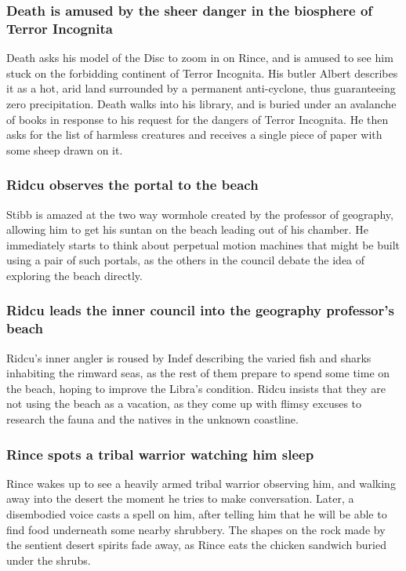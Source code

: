 \subsubsection{\Gls{Death} is amused by the sheer danger in the biosphere of Terror Incognita}
\Gls{Death} asks his model of the Disc to zoom in on \Gls{Rince}, and is amused to see him stuck on
the forbidding continent of Terror Incognita. His butler \Gls{Albert} describes it as a hot, arid
land surrounded by a permanent anti-cyclone, thus guaranteeing zero precipitation. \Gls{Death}
walks into his library, and is buried under an avalanche of books in response to his request for
the dangers of Terror Incognita. He then asks for the list of harmless creatures and receives a
single piece of paper with some sheep drawn on it.

\subsubsection{\Gls{Ridcu} observes the portal to the beach}
\Gls{Stibb} is amazed at the two way wormhole created by the professor of geography, allowing him
to get his suntan on the beach leading out of his chamber. He immediately starts to think about
perpetual motion machines that might be built using a pair of such portals, as the others in the
council debate the idea of exploring the beach directly.

\subsubsection{\Gls{Ridcu} leads the inner council into the geography professor's beach}
\Gls{Ridcu}'s inner angler is roused by \Gls{Indef} describing the varied fish and sharks inhabiting
the rimward seas, as the rest of them prepare to spend some time on the beach, hoping to improve the
\Gls{Libra}'s condition. \Gls{Ridcu} insists that they are not using the beach as a vacation, as
they come up with flimsy excuses to research the fauna and the natives in the unknown coastline.

\subsubsection{\Gls{Rince} spots a tribal warrior watching him sleep}
\Gls{Rince} wakes up to see a heavily armed tribal warrior observing him, and walking away into the
desert the moment he tries to make conversation. Later, a disembodied voice casts a spell on him,
after telling him that he will be able to find food underneath some nearby shrubbery. The shapes on
the rock made by the sentient desert spirits fade away, as \Gls{Rince} eats the chicken sandwich
buried under the shrubs.

